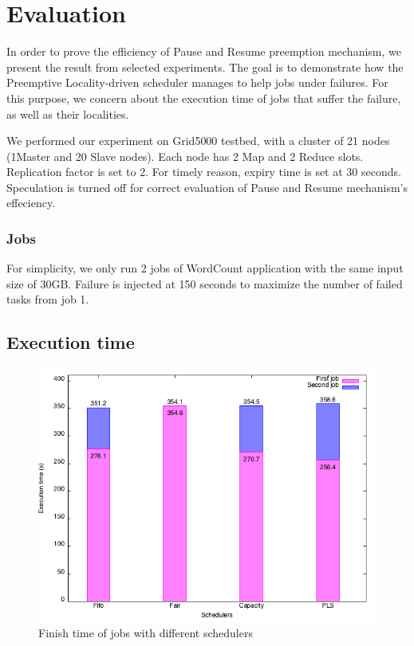\documentclass[runningheads,a4paper]{llncs}
\begin{document}
\section{Evaluation}
In order to prove the efficiency of Pause and Resume preemption mechanism, we present the result from selected experiments. The goal is to demonstrate how the Preemptive Locality-driven scheduler manages to help jobs under failures. For this purpose, we concern about the execution time of jobs that suffer the failure, as well as their localities.

We performed our experiment on Grid5000 testbed, with a cluster of 21 nodes (1Master and 20 Slave nodes). Each node has 2 Map and 2 Reduce slots. Replication factor is set to 2. For timely reason, expiry time is set at 30 seconds. Speculation is turned off for correct evaluation of Pause and Resume mechanism's effeciency.

\subsubsection*{Jobs}
For simplicity, we only run 2 jobs of WordCount application with the same input size of 30GB. Failure is injected at 150 seconds to maximize the number of failed tasks from job 1.

\subsection*{Execution time}
\begin{figure}[ht]
    \centering
    \includegraphics[width=1\linewidth]{time.png}
    \caption{Finish time of jobs with different schedulers}
    \label{fig:finalTime}
\end{figure}
\end{document}
